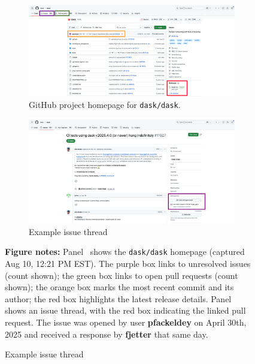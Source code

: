\begin{figure}[ht]
  \centering

  \caption{Github project exhibits} \label{fig:dask-screenshots}

  \medskip
  \begin{subfigure}[b]{0.9\textwidth}
    \centering
    \caption{GitHub project homepage for \texttt{dask/dask}.}\label{fig:dask-home}
    \includegraphics[width=\textwidth]{temp/dask_explainers/dask_homepage.png}
  \end{subfigure}

  \medskip

  \begin{subfigure}[b]{0.9\textwidth}
    \centering
    \caption{Example issue thread}\label{fig:dask-issue}
    \includegraphics[width=\textwidth]{temp/dask_explainers/issue_thread.png}
  \end{subfigure}

    \bigskip
  \vspace{1ex}
  \centering
  \begin{minipage}{0.9\textwidth}
    \textbf{Figure notes:} 
    Panel~ shows the \texttt{dask/dask} homepage (captured Aug 10, 12:21 PM EST).  
    The purple box links to unresolved issues (count shown); the green box links to open pull requests (count shown);  
    the orange box marks the most recent commit and its author; the red box highlights the latest release details. 
    Panel~ shows an issue thread, with the red box indicating the linked pull request. The issue was opened by user \textbf{pfackeldey} on April 30th, 2025 and received a response by \textbf{fjetter} that same day. 
  \end{minipage}


\end{figure}
\pagebreak